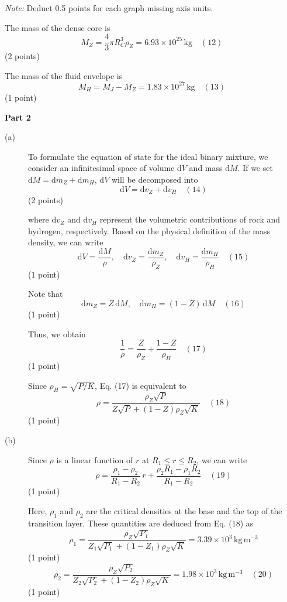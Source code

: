 \begin{description}

  \textit{Note:} Deduct 0.5 points for each graph missing axis units.

\item[(d)] The mass of the dense core is
  \[ M_Z = \frac{4}{3}\pi R_C^3 \rho_Z = 6.93 \times 10^{25}\,\mathrm{kg}
     \quad (12) \]
  \hfill(2 points)

  The mass of the fluid envelope is
  \[ M_H = M_J - M_Z = 1.83 \times 10^{27}\,\mathrm{kg} \quad (13) \]
  \hfill(1 point)
\end{description}

\medskip\noindent\textbf{Part 2}

\begin{description}
\item[(a)] To formulate the equation of state for the ideal binary mixture, we
  consider an infinitesimal space of volume $\mathrm{d}V$ and mass
  $\mathrm{d}M$. If we set $\mathrm{d}M = \mathrm{d}m_Z + \mathrm{d}m_H$,
  $\mathrm{d}V$ will be decomposed into
  \[ \mathrm{d}V = \mathrm{d}v_Z + \mathrm{d}v_H \quad (14) \]
  \hfill(2 points)

  where $\mathrm{d}v_Z$ and $\mathrm{d}v_H$ represent the volumetric
  contributions of rock and hydrogen, respectively. Based on the physical
  definition of the mass density, we can write
  \[ \mathrm{d}V = \frac{\mathrm{d}M}{\rho}, \quad
     \mathrm{d}v_Z = \frac{\mathrm{d}m_Z}{\rho_Z}, \quad
     \mathrm{d}v_H = \frac{\mathrm{d}m_H}{\rho_H} \quad (15) \]
  \hfill(1 point)

  Note that
  \[ \mathrm{d}m_Z = Z\,\mathrm{d}M, \quad
     \mathrm{d}m_H = (1 - Z)\,\mathrm{d}M \quad (16) \]
  \hfill(1 point)

  Thus, we obtain
  \[ \frac{1}{\rho} = \frac{Z}{\rho_Z} + \frac{1 - Z}{\rho_H} \quad (17) \]
  \hfill(1 point)

  Since $\rho_H = \sqrt{P/K}$, Eq. (17) is equivalent to
  \[ \rho = \frac{\rho_Z\sqrt{P}}{Z\sqrt{P} + (1 - Z)\rho_Z\sqrt{K}}
     \quad (18) \]
  \hfill(1 point)

\item[(b)] Since $\rho$ is a linear function of $r$ at $R_1 \le r \le R_2$, we
  can write
  \[ \rho = \frac{\rho_1 - \rho_2}{R_1 - R_2}\,r
     + \frac{\rho_2 R_1 - \rho_1 R_2}{R_1 - R_2} \quad (19) \]
  \hfill(1 point)

  Here, $\rho_1$ and $\rho_2$ are the critical densities at the base and the
  top of the transition layer. These quantities are deduced from Eq. (18) as
  \[ \rho_1 = \frac{\rho_Z\sqrt{P_1}}{Z_1\sqrt{P_1} + (1 - Z_1)\rho_Z\sqrt{K}}
     = 3.39 \times 10^{3}\,\mathrm{kg\,m^{-3}} \]
  \hfill(1 point)
  \[ \rho_2 = \frac{\rho_Z\sqrt{P_2}}{Z_2\sqrt{P_2} + (1 - Z_2)\rho_Z\sqrt{K}}
     = 1.98 \times 10^{3}\,\mathrm{kg\,m^{-3}} \quad (20) \]
  \hfill(1 point)


\end{description}

